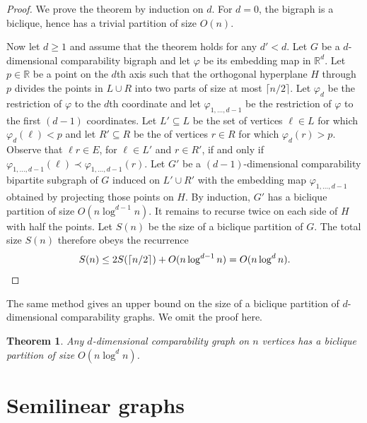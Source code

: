 \documentclass{amsart}
\newtheorem{theorem}{Theorem}%
\begin{document}
\begin{proof}
We prove the theorem by induction on $d$. 
For $d=0$, the bigraph is a biclique, hence has a trivial partition of size $O(n)$.

Now let $d\ge 1$ and assume that the theorem holds for any $d'<d$.  
Let $G$ be a $d$-dimensional comparability bigraph and let $\varphi$ be its embedding map in $\mathbb{R}^d$.
Let $p\in \mathbb{R}$ be a point on the $d$th axis such that the orthogonal hyperplane $H$ through $p$ divides the points in $L\cup R$ into two parts of size at most $\lceil n/2\rceil$. 
Let $\varphi_d$ be the restriction of $\varphi$ to the $d$th coordinate and let $\varphi_{1,\ldots,d-1}$ be the restriction of $\varphi$ to the first $(d-1)$ coordinates. 
Let $L'\subseteq L$ be the set of vertices $\ell \in L$ for which $\varphi_d(\ell)<p$ and let $R'\subseteq R$ be the of vertices $r\in R$ for which $\varphi_d(r)>p$. 
Observe that $\ell r\in E$, for $\ell \in L'$ and $r\in R'$, if and only if $\varphi_{1,\ldots,d-1}(\ell)\prec \varphi_{1,\ldots,d-1}(r)$.
Let $G'$ be a $(d-1)$-dimensional comparability bipartite subgraph of $G$ induced on $L'\cup R'$ with the embedding map $\varphi_{1,\ldots,d-1}$ obtained by projecting those points on $H$.
By induction, $G'$ has a biclique partition of size $O(n\log^{d-1} n)$. 
It remains to recurse twice on each side of $H$ with half the points. 
Let $S(n)$ be the size of a biclique partition of $G$.
The total size $S(n)$ therefore obeys the recurrence
\[
S(n) \leq 2 S(\lceil n/2\rceil) + O(n \log^{d-1} n) = O(n\log^d n). \qedhere
\]
\end{proof}

The same method gives an upper bound on the size of a biclique partition of $d$-dimensional comparability graphs.
We omit the proof here.

\begin{theorem}\label{thm:dddgraph}
    Any $d$-dimensional comparability graph on $n$ vertices has a biclique partition of size $O(n \log^d n)$.
\end{theorem}

\section{Semilinear graphs}
\label{sec:semilinear}
\end{document}
